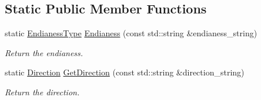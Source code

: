 \subsection*{Static Public Member Functions}
\begin{DoxyCompactItemize}
\item 
static \hyperlink{structAadlInformation_1_1AadlParameter_a1b095cc6220ca218732206b6c3994192}{Endianess\+Type} \hyperlink{structAadlInformation_1_1AadlParameter_ab6f9fc5ad1d0f77d9a02967917d18422}{Endianess} (const std\+::string \&endianess\+\_\+string)
\begin{DoxyCompactList}\small\item\em Return the endianess. \end{DoxyCompactList}\item 
static \hyperlink{structAadlInformation_1_1AadlParameter_a4f3dba322ae2eb8ecec6f6199f81a77e}{Direction} \hyperlink{structAadlInformation_1_1AadlParameter_aa2e43e8d58fd796e2c9573738db5a41b}{Get\+Direction} (const std\+::string \&direction\+\_\+string)
\begin{DoxyCompactList}\small\item\em Return the direction. \end{DoxyCompactList}\end{DoxyCompactItemize}
